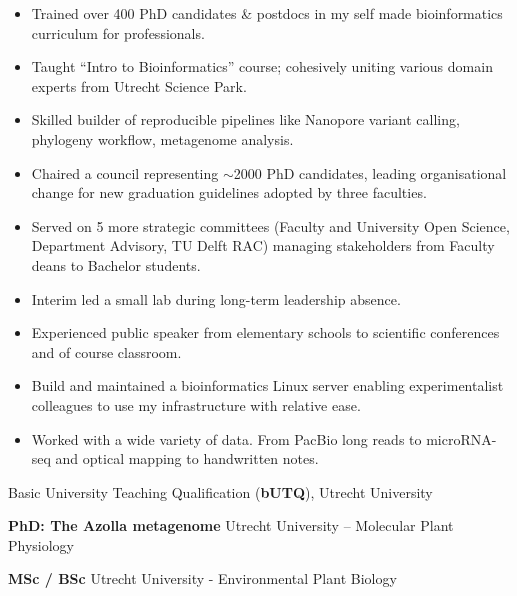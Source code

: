 \documentclass[a4paper,10pt]{article}
\begin{document}
{\begin{adjustbox}{valign=t}
\begin{minipage}[t]{0.6\textwidth}
\begin{itemize}
    \setlength{\itemindent}{0em}
    \setlength{\parindent}{5em}
  \item Trained over 400 PhD candidates \& postdocs in my self made bioinformatics curriculum for professionals.
  \item Taught “Intro to Bioinformatics” course; cohesively uniting various domain experts from Utrecht Science Park.
  \item Skilled builder of reproducible pipelines like Nanopore variant calling, phylogeny workflow, metagenome analysis.
  \item Chaired a council representing $\sim$2000 PhD candidates, leading organisational change for new graduation guidelines adopted by three faculties.
  \item Served on 5 more strategic committees (Faculty and University Open Science, Department Advisory, TU Delft RAC) managing stakeholders from Faculty deans to Bachelor students.
  \item Interim led a small lab during long-term leadership absence.
  \item Experienced public speaker from elementary schools to scientific conferences and of course classroom.
  \item Build and maintained a bioinformatics Linux server enabling experimentalist colleagues to use my infrastructure with relative ease.
  \item Worked with a wide variety of data. From PacBio long reads to microRNA-seq and optical mapping to handwritten notes.
\end{itemize}


\end{minipage}%
\end{adjustbox}%
}
\newpage

\begin{description}
  \raggedright
  \item[\normalfont \textcolor{ForestGreen}{\textbf{2022.}}] Basic University Teaching Qualification (\textbf{bUTQ}), Utrecht University
  \item[\normalfont \textcolor{ForestGreen}{\textbf{2017 -- 2022.}}] \textbf{PhD: The Azolla metagenome} Utrecht University – Molecular Plant Physiology
  \item[\normalfont \textcolor{ForestGreen}{\textbf{2010 -- 2017.}}] \textbf{MSc / BSc} Utrecht University - Environmental Plant Biology
\end{description}
\end{document}
